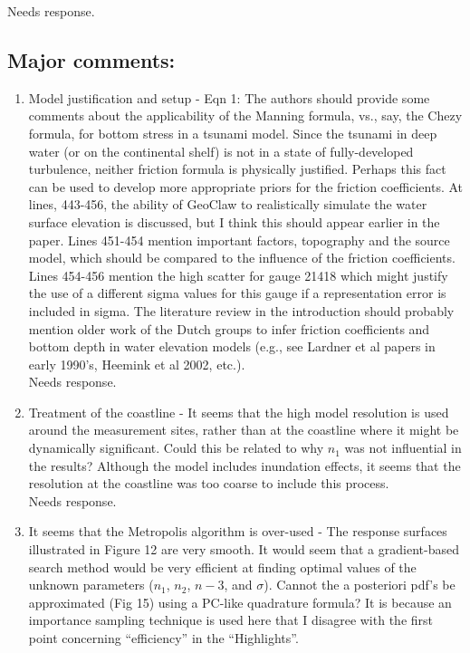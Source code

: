 \documentclass[]{article}
\newcommand{\alert}[1]{{\color{red} #1}}
\begin{document}
\alert{Needs response.} \\

\subsection*{Major comments:}
\begin{enumerate}
\item Model justification and setup - Eqn 1: The authors should provide some comments about the applicability of the Manning formula, vs., say, the Chezy formula, for bottom stress in a tsunami model. Since the tsunami in deep water (or on the continental shelf) is not in a state of fully-developed turbulence, neither friction formula is physically justified. Perhaps this fact can be used to develop more appropriate priors for the friction coefficients. At lines, 443-456, the ability of GeoClaw to realistically simulate the water surface elevation is discussed, but I think this should appear earlier in the paper. Lines 451-454 mention important factors, topography and the source model, which should be compared to the influence of the friction coefficients. Lines 454-456 mention the high scatter for gauge 21418 which might justify the use of a different sigma values for this gauge if a representation error is included in sigma. The literature review in the introduction should probably mention older work of the
Dutch groups to infer friction coefficients and bottom depth in water elevation models (e.g., see Lardner et al papers in early 1990's, Heemink et al 2002, etc.).\\

\alert{Needs response.} \\

\item Treatment of the coastline - It seems that the high model resolution is used around the measurement sites, rather than at the coastline where it might be dynamically significant. Could this be related to why $n_1$ was not influential in the results? Although the model includes inundation effects, it seems that the resolution at the coastline was too coarse to include this process.\\

\alert{Needs response.} \\

\item It seems that the Metropolis algorithm is over-used - The response surfaces illustrated in Figure 12 are very smooth. It would seem that a gradient-based search method would be very efficient at finding optimal values of the unknown parameters ($n_1$, $n_2$, $n-3$, and $\sigma$). Cannot the a posteriori pdf's be approximated (Fig 15) using a PC-like quadrature formula? It is because an importance sampling technique is used here that I disagree with the first point concerning ``efficiency'' in the ``Highlights''.\\


\end{enumerate}
\end{document}
